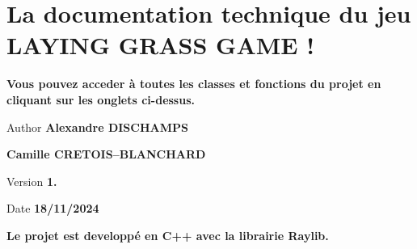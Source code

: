 \chapter{La documentation technique du jeu LAYING GRASS GAME !}
\hypertarget{index}{}\label{index}
{\bfseries{Vous pouvez acceder à toutes les classes et fonctions du projet en cliquant sur les onglets ci-\/dessus.}} \begin{DoxyAuthor}{Author}
{\bfseries{Alexandre DISCHAMPS}} 

{\bfseries{Camille CRETOIS--BLANCHARD}} 
\end{DoxyAuthor}
\begin{DoxyVersion}{Version}
{\bfseries{1.}} 
\end{DoxyVersion}
\begin{DoxyDate}{Date}
{\bfseries{18/11/2024}}
\end{DoxyDate}
{\bfseries{Le projet est developpé en C++ avec la librairie Raylib.}} 